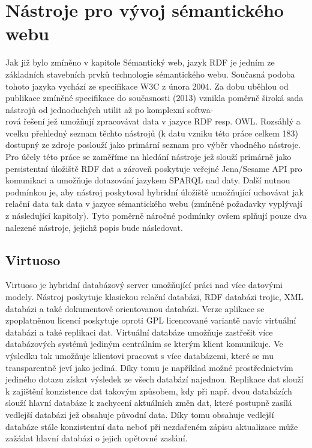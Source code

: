 \documentclass{projekt}
\begin{document}
\chapter{Nástroje pro vývoj sémantického webu}
\hspace{0.65cm}Jak již bylo zmíněno v kapitole Sémantický web, jazyk RDF je jedním ze základních stavebních prvků  technologie sémantického webu. Současná podoba tohoto jazyka vychází ze specifikace W3C \cite{_6} z února 2004. Za dobu uběhlou od publikace zmíněné specifikace do současnosti (2013) vznikla poměrně široká sada nástrojů od jednoduchých utilit až po komplexní softwa-\\rová řešení jež umožňují zpracovávat data v jazyce RDF resp. OWL. Rozsáhlý a vcelku přehledný seznam těchto nástrojů (k datu vzniku této práce celkem 183) dostupný ze zdroje  \cite{_23} poslouží jako primární seznam pro výběr vhodného nástroje. Pro účely této práce se zaměříme na hledání nástroje jež slouží primárně jako persistentní úložiště RDF dat a zároveň poskytuje veřejné Jena/Sesame API pro  komunikaci a umožňuje dotazování jazykem SPARQL nad daty. Další nutnou podmínkou je, aby nástroj poskytoval hybridní úložiště umožňující uchovávat jak relační data tak data v jazyce sémantického webu (zmíněné požadavky vyplývají z následující kapitoly). Tyto poměrně náročné podmínky ovšem splňují pouze dva nalezené nástroje, jejichž popis bude následovat.

\section{Virtuoso}
\hspace{0.65cm}Virtuoso je hybridní databázový server umožňující práci nad více datovými modely. Nástroj poskytuje klasickou relační databázi, RDF databázi trojic, XML databázi a také dokumentově orientovanou databázi. Verze aplikace se zpoplatněnou licencí poskytuje oproti GPL licencované variantě navíc virtuální databázi a také replikaci dat. Virtuální databáze umožňuje zastřešit více databázových systémů jediným centrálním se kterým klient komunikuje. Ve výsledku tak umožňuje klientovi pracovat s více databázemi, které se mu transparentně jeví jako jediná. Díky tomu je například možné prostřednictvím jediného dotazu získat výsledek ze všech databází najednou. Replikace dat slouží  k zajištění konzistence dat takovým způsobem, kdy při např. dvou databázích slouží hlavní databáze k zachycení aktuálních změn dat, které postupně zasílá vedlejší databázi jež obsahuje původní data. Díky tomu obsahuje vedlejší databáze stále konzistentní data neboť při nezdařeném zápisu aktualizace může zažádat hlavní databázi o jejich opětovné zaslání. 
\end{document}
